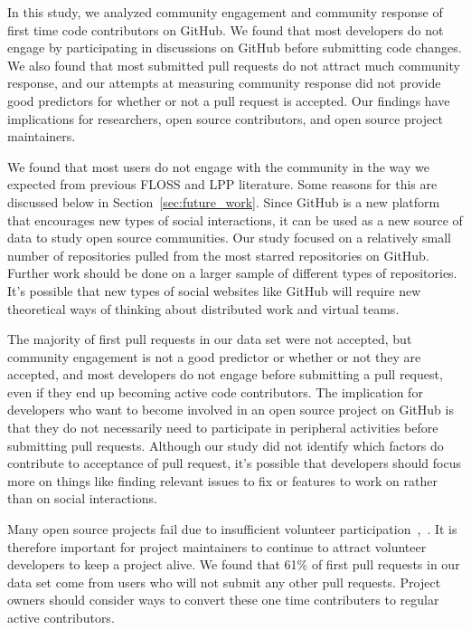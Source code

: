 \documentclass{sigchi}
\begin{document}
In this study, we analyzed community engagement and community response of first
time code contributors on GitHub. We found that most developers do not engage by
participating in discussions on GitHub before submitting code changes. We also
found that most submitted pull requests do not attract much community response,
and our attempts at measuring community response did not provide good predictors
for whether or not a pull request is accepted. Our findings have implications
for researchers, open source contributors, and open source project maintainers.

We found that most users do not engage with the community in the way we expected
from previous FLOSS and LPP literature. Some reasons for this are discussed
below in Section~\ref{sec:future_work}. Since GitHub is a new platform that
encourages new types of social interactions, it can be used as a new source of
data to study open source communities. Our study focused on a relatively small
number of repositories pulled from the most starred repositories on GitHub.
Further work should be done on a larger sample of different types of
repositories. It's possible that new types of social websites like GitHub will
require new theoretical ways of thinking about distributed work and virtual
teams.

The majority of first pull requests in our data set were not accepted, but
community engagement is not a good predictor or whether or not they are
accepted, and most developers do not engage before submitting a pull request,
even if they end up becoming active code contributors. The implication for
developers who want to become involved in an open source project on GitHub is
that they do not necessarily need to participate in peripheral activities before
submitting pull requests. Although our study did not identify which factors do
contribute to acceptance of pull request, it's possible that developers should
focus more on things like finding relevant issues to fix or features to work on
rather than on social interactions.

Many open source projects fail due to insufficient volunteer
participation~\cite{crowston_defining_2003},~\cite{krishnamurthy_cave_2002}. It
is therefore important for project maintainers to continue to attract volunteer
developers to keep a project alive. We found that 61\% of first pull requests in
our data set come from users who will not submit any other pull requests.
Project owners should consider ways to convert these one time contributers to
regular active contributors.
\end{document}
